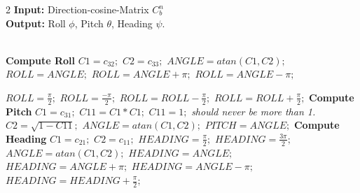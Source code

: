 \documentclass[journal]{IEEEtran}
\begin{document}
\begin{tcolorbox}[float*=!tbph]
\begin{algorithm}[H]
\caption{Efficient roll, pitch, and heading computation}
\begin{multicols}{2}
 \hspace*{\algorithmicindent} \textbf{Input:} Direction-cosine-Matrix $C_b^n$ \\
 \hspace*{\algorithmicindent} \textbf{Output:} Roll $\phi$, Pitch $\theta$, Heading $\psi$.
\begin{algorithmic}[1]
\\\textbf{\color{Red}Compute Roll}
\State $C1 = c_{32};$
\State $C2 = c_{33};$
\State $ ANGLE=atan(C1,C2);$\footnotemark
{}
\State $ROLL = ANGLE;$
\EndIf
{}
        \State $ROLL = ANGLE + \pi;$
        \Else
        \State $ROLL = ANGLE - \pi;$
        \EndIf
\EndIf

        \State $ROLL = \frac{\pi}{2};$
        \Else
        \State $ROLL = \frac{-\pi}{2};$
        \EndIf
\EndIf
{}
  \State $ROLL =ROLL - \frac{\pi}{2};$
\EndIf
{}
  \State $ROLL =ROLL + \frac{\pi}{2};$
\EndIf
\State \textbf{\color{Red}Compute Pitch}
\State $C1 = c_{31};$
\State $C11 = C1 * C1;$
       \State $C11 = 1;$ \Comment \textit{ should never be more than 1.}
\EndIf
\State $C2 = \sqrt{1-C11};$
\State $ ANGLE=atan(C1,C2);$
\State $PITCH = ANGLE;$
\State \textbf{\color{Red}Compute Heading}
\State $C1 = c_{21};$
\State $C2 = c_{11};$
        \State $HEADING = \frac{\pi}{2};$
        \Else
        \State $HEADING = \frac{3\pi}{2};$
        \EndIf
\Else
       \State $ ANGLE=atan(C1,C2);$
        \State $HEADING = ANGLE;$
        \Else
                 \State $HEADING = ANGLE + \pi;$
                 \Else
                 \State $HEADING = ANGLE - \pi;$
                   \EndIf
        \EndIf
\EndIf
{}
       \State $HEADING  =HEADING +\frac{\pi}{2} ;$ 
\EndIf
\end{algorithmic}
\end{multicols}
\end{algorithm}
\end{tcolorbox}
\end{document}
